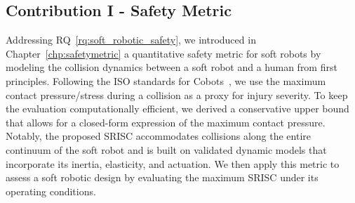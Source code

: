 \subsection{Contribution I - Safety Metric}
Addressing RQ~\ref{rq:soft_robotic_safety}, we introduced in Chapter~\ref{chp:safetymetric} a quantitative safety metric for soft robots by modeling the collision dynamics between a soft robot and a human from first principles. Following the ISO standards for \glspl{Cobot}~\citep{iso2016collaborative}, we use the maximum contact pressure/stress during a collision as a proxy for injury severity. To keep the evaluation computationally efficient, we derived a conservative upper bound that allows for a closed-form expression of the maximum contact pressure. Notably, the proposed \gls{SRISC} accommodates collisions along the entire continuum of the soft robot and is built on validated dynamic models that incorporate its inertia, elasticity, and actuation. We then apply this metric to assess a soft robotic design by evaluating the maximum \gls{SRISC} under its operating conditions.

